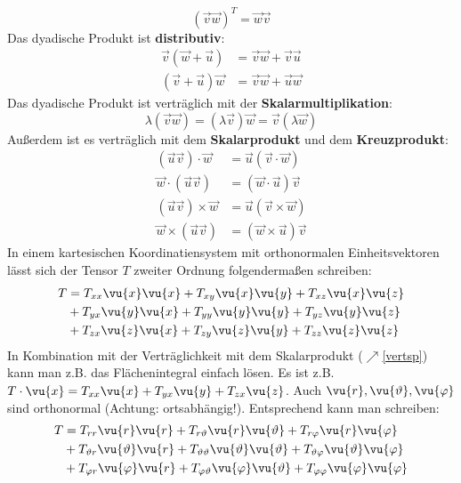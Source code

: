 	\begin{equation}
		\left(\vec{v}\vec{w}\right)^T=\vec{w}\vec{v}
	\end{equation}
	Das dyadische Produkt ist \textbf{distributiv}:
	\begin{equation}\begin{split}
		\vec{v}(\vec{w}+\vec{u})&=\vec{v}\vec{w}+\vec{v}\vec{u}\\
		(\vec{v}+\vec{u})\vec{w}&=\vec{v}\vec{w}+\vec{u}\vec{w}
	\end{split}	\end{equation}
	Das dyadische Produkt ist verträglich mit der \textbf{Skalarmultiplikation}:
	\begin{equation}
		\lambda(\vec{v}\vec{w})=(\lambda\vec{v})\vec{w}=\vec{v}(\lambda\vec{w})
\end{equation}
	Außerdem ist es verträglich mit dem \textbf{Skalarprodukt} und dem \textbf{Kreuzprodukt}:
	\begin{equation}\label{vertsp}\begin{split}
		(\vec{u}\vec{v})\cdot\vec{w}&=\vec{u}(\vec{v}\cdot\vec{w})\\
		\vec{w}\cdot (\vec{u}\vec{v})&=(\vec{w}\cdot\vec{u})\vec{v}\\
		(\vec{u}\vec{v})\times\vec{w}&=\vec{u}(\vec{v}\times\vec{w})\\
		\vec{w}\times (\vec{u}\vec{v})&=(\vec{w}\times\vec{u})\vec{v}
	\end{split}\end{equation}
	In einem kartesischen Koordinatiensystem mit orthonormalen Einheitsvektoren lässt sich der Tensor $T$ zweiter Ordnung folgendermaßen schreiben:
	\begin{equation}\begin{split}
			T &= T_{xx} \vu{x}\vu{x} + T_{xy} \vu{x}\vu{y} + T_{xz} \vu{x}\vu{z} \\
			&+ T_{yx} \vu{y}\vu{x} + T_{yy} \vu{y}\vu{y} + T_{yz} \vu{y}\vu{z} \\
			&+ T_{zx} \vu{z}\vu{x} + T_{zy} \vu{z}\vu{y} + T_{zz} \vu{z}\vu{z} \\
	\end{split}\end{equation}
	In Kombination mit der Verträglichkeit mit dem Skalarprodukt ($\nearrow$\ref{vertsp}) kann man z.B. das Flächenintegral einfach lösen. Es ist z.B. $T\cdot\vu{x}=T_{xx}\vu{x}+T_{yx} \vu{y}+T_{zx} \vu{z}$. Auch $\vu{r},\vu{\vartheta},\vu{\varphi}$ sind orthonormal (Achtung: ortsabhängig!). Entsprechend kann man schreiben:
	\begin{equation}\begin{split}
			T &= T_{rr} \vu{r}\vu{r} + T_{r\vartheta} \vu{r}\vu{\vartheta} + T_{r\varphi} \vu{r}\vu{\varphi} \\
			&+ T_{\vartheta r} \vu{\vartheta}\vu{r} + T_{\vartheta\vartheta} \vu{\vartheta}\vu{\vartheta} + T_{\vartheta\varphi} \vu{\vartheta}\vu{\varphi} \\
			&+ T_{\varphi r} \vu{\varphi}\vu{r} + T_{\varphi\vartheta} \vu{\varphi}\vu{\vartheta} + T_{\varphi\varphi} \vu{\varphi}\vu{\varphi} \\
	\end{split}\end{equation}
